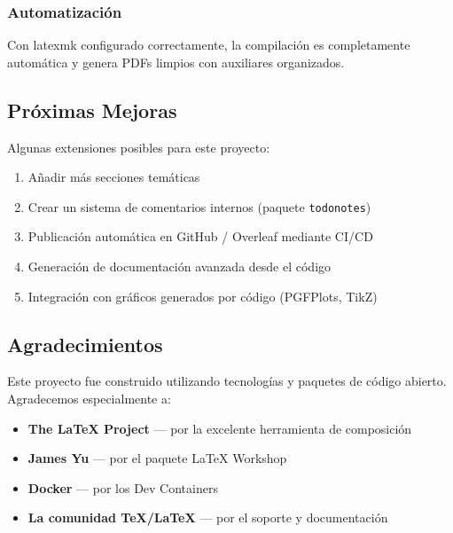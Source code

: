 \documentclass[/work/src/main.tex]{subfiles}
\begin{document}
\subsubsection{Automatización}
Con latexmk configurado correctamente, la compilación es completamente automática y genera PDFs limpios con auxiliares organizados.

\subsection{Próximas Mejoras}
Algunas extensiones posibles para este proyecto:

\begin{enumerate}
    \item Añadir más secciones temáticas
    \item Crear un sistema de comentarios internos (paquete \texttt{todonotes})
    \item Publicación automática en GitHub / Overleaf mediante CI/CD
    \item Generación de documentación avanzada desde el código
    \item Integración con gráficos generados por código (PGFPlots, TikZ)
\end{enumerate}

\subsection{Agradecimientos}
Este proyecto fue construido utilizando tecnologías y paquetes de código abierto. Agradecemos especialmente a:

\begin{itemize}
    \item \textbf{The LaTeX Project} — por la excelente herramienta de composición
    \item \textbf{James Yu} — por el paquete LaTeX Workshop
    \item \textbf{Docker} — por los Dev Containers
    \item \textbf{La comunidad TeX/LaTeX} — por el soporte y documentación
\end{itemize}
\end{document}
